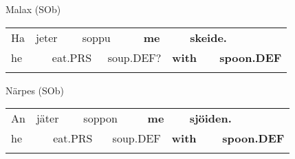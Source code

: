 
\begin{listWWNumileveli}
\item 

\end{listWWNumileveli}

\begin{listWWNumxlixleveli}
\item 

\begin{styleExLtrTbl}
Malax (SOb)

\end{styleExLtrTbl}

\end{listWWNumxlixleveli}

\begin{tabular}{llllllllll}
\lsptoprule
Ha & \multicolumn{2}{l}{jeter

} & \multicolumn{2}{l}{soppu

} & \multicolumn{2}{l}{{\bfseries me}

} & \multicolumn{2}{l}{{\bfseries skeide.}

} & \\
\multicolumn{2}{l}{he

} & \multicolumn{2}{l}{eat.PRS

} & \multicolumn{2}{l}{soup.DEF?

} & \multicolumn{2}{l}{{\bfseries with}

} & \multicolumn{2}{l}{{\bfseries spoon.DEF}

}\\
\lspbottomrule
\end{tabular}

\begin{styleExLtrTblii}
Närpes (SOb)

\end{styleExLtrTblii}

\begin{tabular}{llllllllll}
\lsptoprule
An & \multicolumn{2}{l}{jäter

} & \multicolumn{2}{l}{soppon

} & \multicolumn{2}{l}{{\bfseries me}

} & \multicolumn{2}{l}{{\bfseries sjöiden.}

} & \\
\multicolumn{2}{l}{he

} & \multicolumn{2}{l}{eat.PRS

} & \multicolumn{2}{l}{soup.DEF

} & \multicolumn{2}{l}{{\bfseries with}

} & \multicolumn{2}{l}{{\bfseries spoon.DEF}

}\\
\lspbottomrule
\end{tabular}

